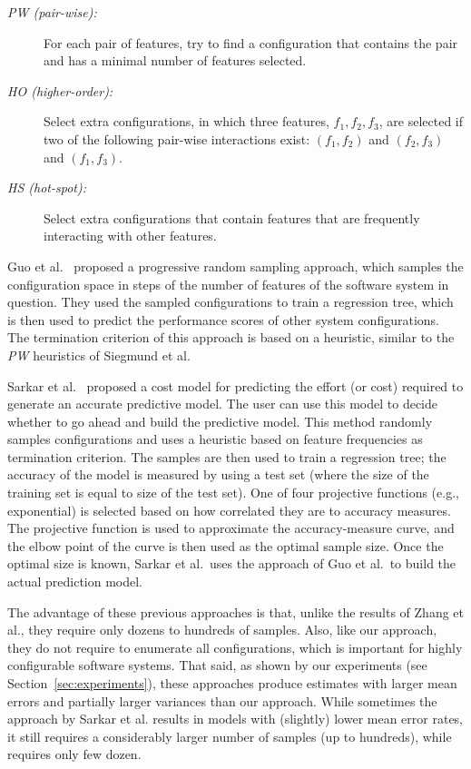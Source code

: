 \begin{description}
\item[{\em PW (pair-wise):}] For each pair of features, try to find a configuration that contains the pair and has a minimal number of features selected. 
\item[{\em HO (higher-order):}] Select extra configurations, in which three features, $f_1,f_2,f_3$, are selected if two of the following pair-wise interactions exist: $(f_1,f_2)$ and $(f_2,f_3)$ and $(f_1,f_3)$.
\item[{\em HS (hot-spot):}] Select extra configurations that contain features that are
frequently interacting with other features. 
\end{description}


Guo et al.~\cite{guo2013variability} proposed a progressive random sampling approach, which samples the configuration space in steps of the number of features of the software system in question. They used the sampled configurations to train a regression tree, which is then used to predict the performance scores of other system configurations. The termination criterion of this approach is based on a heuristic, similar to the {\em PW} heuristics of Siegmund et al. 

Sarkar et al.~\cite{sarkar2015cost} proposed a cost model for predicting the effort (or cost) required to generate an accurate predictive model. The user can use this model to decide whether to go ahead and build the predictive model. This method randomly samples configurations and uses a heuristic based on feature frequencies as termination criterion. The samples are then used to train a regression tree; the accuracy of the model is measured by using a test set (where the size of the training set is equal to size of the test set). One of four projective functions (e.g., exponential) is selected based on how correlated they are to  accuracy measures. The projective function is used to approximate the accuracy-measure curve, and the elbow point of the curve is then used as the optimal sample size. Once the optimal size is known, Sarkar et al.\ uses the approach of Guo et al.\ to build the actual prediction model.  


The advantage of these previous approaches is that, unlike  the results of Zhang et al., they require only dozens to hundreds of samples. Also, like our approach, they do not require to enumerate all configurations, which is important for highly configurable software systems. 
That said, as shown by our experiments (see Section~\ref{sec:experiments}), these approaches produce estimates with  larger mean errors and partially larger variances than our approach. While sometimes the approach by Sarkar et al. results in  models with (slightly)
lower mean error rates, it still requires a considerably larger number of samples (up to hundreds), while \what requires only few dozen.
 
